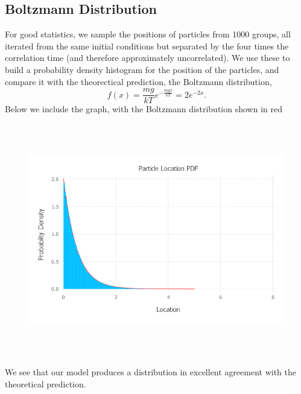 \documentclass{article}
\begin{document}
\subsection{Boltzmann Distribution}
For good statistics, we sample the positions of particles from 1000 groups, all iterated from the same initial conditions but separated by the four times the correlation time (and therefore approximately uncorrelated). We use these to build a probability density histogram for the position of the particles, and compare it with the theorectical prediction, the Boltzmann distribution,
$$f(x) = \frac{mg}{kT}e^{-\frac{mgx}{kT}} = 2e^{-2x}.$$
Below we include the graph, with the Boltzmann distribution shown in red
\begin{figure}[H]
	\includegraphics[width=6in,height=4in]{"boltzmann"}
\end{figure}

We see that our model produces a distribution in excellent agreement with the theoretical prediction.
\end{document}
